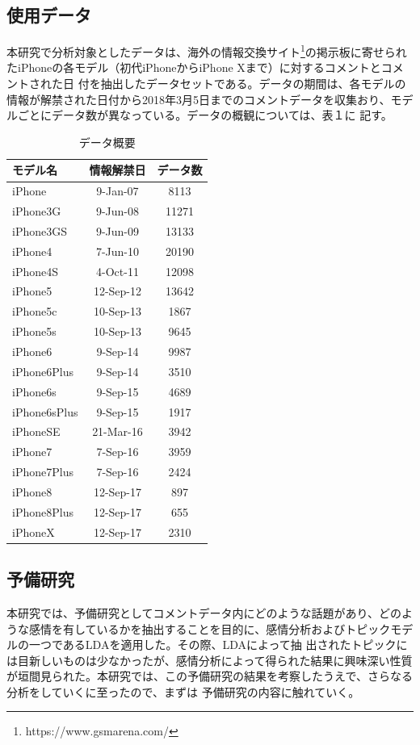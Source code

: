 \documentclass[uplatex,11pt]{jsarticle}
\begin{document}
\subsection{使用データ}
本研究で分析対象としたデータは、海外の情報交換サイト\footnote{https://www.gsmarena.com/}の掲示板に寄せられたiPhoneの各モデル（初代iPhoneからiPhone Xまで）に対するコメントとコメントされた日
付を抽出したデータセットである。データの期間は、各モデルの情報が解禁された日付から2018年3月5日までのコメントデータを収集おり、モデルごとにデータ数が異なっている。データの概観については、表１に
記す。
\begin{table}
    \begin{center}
    \small
    \caption{データ概要}
    \begin{tabular}{|l|cc|}
    \hline
    モデル名      & 情報解禁日 & データ数  \\ \hline
    iPhone       & 9-Jan-07  & 8113  \\
    iPhone3G     & 9-Jun-08  & 11271 \\
    iPhone3GS    & 9-Jun-09  & 13133 \\
    iPhone4      & 7-Jun-10  & 20190 \\
    iPhone4S     & 4-Oct-11  & 12098 \\
    iPhone5      & 12-Sep-12 & 13642 \\
    iPhone5c     & 10-Sep-13 & 1867  \\
    iPhone5s     & 10-Sep-13 & 9645  \\
    iPhone6      & 9-Sep-14  & 9987  \\
    iPhone6Plus  & 9-Sep-14  & 3510  \\
    iPhone6s     & 9-Sep-15  & 4689  \\
    iPhone6sPlus & 9-Sep-15  & 1917  \\
    iPhoneSE     & 21-Mar-16 & 3942  \\
    iPhone7      & 7-Sep-16  & 3959  \\
    iPhone7Plus  & 7-Sep-16  & 2424  \\
    iPhone8      & 12-Sep-17 & 897   \\
    iPhone8Plus  & 12-Sep-17 & 655   \\
    iPhoneX      & 12-Sep-17 & 2310  \\ \hline
    \end{tabular}
    \end{center}
\end{table}
\subsection{予備研究}
本研究では、予備研究としてコメントデータ内にどのような話題があり、どのような感情を有しているかを抽出することを目的に、感情分析およびトピックモデルの一つであるLDAを適用した。その際、LDAによって抽
出されたトピックには目新しいものは少なかったが、感情分析によって得られた結果に興味深い性質が垣間見られた。本研究では、この予備研究の結果を考察したうえで、さらなる分析をしていくに至ったので、まずは
予備研究の内容に触れていく。
\end{document}
